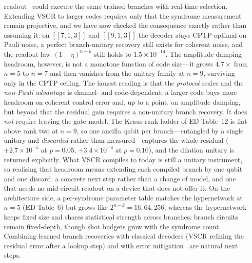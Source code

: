 \documentclass[aps,prxquantum,reprint,superscriptaddress]{revtex4-2}
\begin{document}
readout~\cite{sivak_breakeven,ryan_anderson_rt} could execute the same trained
branches with real-time selection. Extending VSCR to larger codes requires
only that the syndrome measurement remain projective, and we have now checked the
consequence exactly rather than assuming it: on $[\![7,1,3]\!]$ and $[\![9,1,3]\!]$
the decoder stays CPTP-optimal on Pauli noise, a perfect branch-unitary recovery
still exists for coherent noise, and the readout law $(1-\eta)^{n-k}$ still holds
to $1.5\times10^{-14}$. The amplitude-damping headroom, however, is not a
monotone function of code size---it grows $4.7\times$ from $n=5$ to $n=7$ and then
vanishes from the unitary family at $n=9$, surviving only in the CPTP ceiling.
The honest reading is that the \emph{protocol} scales and the \emph{non-Pauli
advantage} is channel- and code-dependent: a larger code buys more headroom on
coherent control error and, up to a point, on amplitude damping, but beyond that
the residual gain requires a non-unitary branch recovery. It does \emph{not}
require leaving the gate model. The Kraus-rank ladder of ED Table~12 is flat above
rank two at $n=9$, so one ancilla qubit per branch---entangled by a single unitary
and \emph{discarded} rather than measured---captures the whole residual
($+2.7\times10^{-5}$ at $p=0.05$, $+3.4\times10^{-4}$ at $p=0.10$), and the
dilation unitary is returned explicitly. What VSCR compiles to today is still a
unitary instrument, so realising that headroom means extending each compiled
branch by one qubit and one discard: a concrete next step rather than a change of
model, and one that needs no mid-circuit readout on a device that does not offer
it. On the architecture side, a per-syndrome
parameter table matches the hypernetwork at $n=5$ (ED Table~6) but grows
like $2^{n-k}=16,64,256$, whereas the hypernetwork keeps fixed size and shares
statistical strength across branches; branch circuits
remain fixed-depth, though shot budgets grow with the syndrome count.
Combining learned branch recoveries with classical decoders (VSCR refining
the residual error after a lookup step) and with error
mitigation~\cite{cai_em_review,suzuki_em} are natural next steps.
\end{document}
